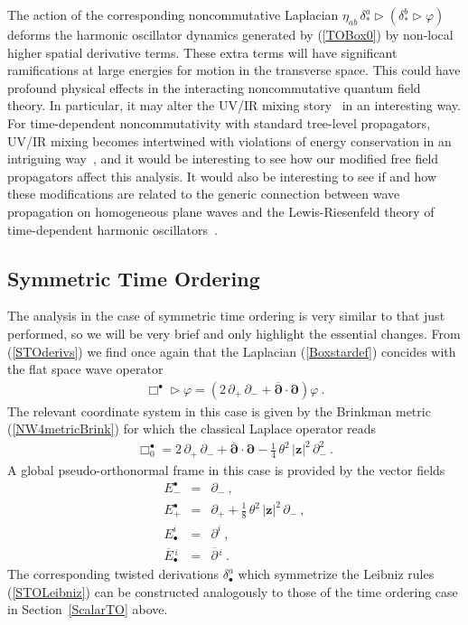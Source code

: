 \documentclass[11pt,a4paper]{article}
\def\nn{\nonumber}
\newcommand{\1}{\mathbb{1}}
\newcommand{\mbf}[1]{{\boldsymbol {#1} }}
\def\mz{{\mbf z}}
\def\mdell{{\mbf\partial}}
\def\nn{\nonumber}
\def\bea{\begin{eqnarray}}
\def\eea{\end{eqnarray}}
\newcommand{\beq}{\begin{eqnarray}}
\newcommand{\eeq}{\end{eqnarray}}
\begin{document}
The action of the corresponding noncommutative Laplacian
$\eta_{ab}\,\delta_*^a\triangleright(\delta_*^b\triangleright\varphi)$
deforms the harmonic oscillator dynamics generated by (\ref{TOBox0})
by non-local higher spatial derivative terms. These extra terms will
have significant ramifications at large energies for motion in the
transverse space. This could have profound physical effects in the
interacting noncommutative quantum field theory. In particular, it may
alter the UV/IR mixing story~\cite{MVRS1} in an interesting way. For
time-dependent noncommutativity with standard tree-level propagators,
UV/IR mixing becomes intertwined with violations of energy
conservation in an intriguing way~\cite{BG1,RS1}, and it would be
interesting to see how our modified free field propagators affect this
analysis. It would also be interesting to see if and how these
modifications are related to the generic connection between wave
propagation on homogeneous plane waves and the Lewis-Riesenfeld theory
of time-dependent harmonic oscillators~\cite{BlauOL1}.

\subsection{Symmetric Time Ordering\label{ScalarSTO}}

The analysis in the case of symmetric time ordering is very similar to
that just performed, so we will be very brief and only highlight the
essential changes. From (\ref{STOderivs}) we find once again that the
Laplacian (\ref{Boxstardef}) concides with the flat space wave
operator
\beq
\Box^\bullet\triangleright\varphi=\left(2\,\partial_+\,\partial_-+
\overline{\mdell}\cdot\mdell\right)\varphi \ .
\label{STOBoxeq}\eeq
The relevant coordinate system in this case is given by the Brinkman
metric (\ref{NW4metricBrink}) for which the classical Laplace
operator reads
\beq
\Box_0^\bullet=2\,\partial_+\,\partial_-+\overline{\mdell}\cdot
\mdell-\mbox{$\frac14$}\,\theta^2\,|\mz|^2\,\partial_-^2 \ .
\label{STOBox0}\eeq
A global pseudo-orthonormal frame in this case is provided by the
vector fields
\bea
E_-^\bullet&=&\partial_- \ , \nn\\ E_+^\bullet&=&\partial_++
\mbox{$\frac18$}\,\theta^2\,|\mz|^2\,\partial_- \ ,
\nn\\ E^{i}_\bullet&=&\partial^i \ , \nn\\
\overline{E}{}_{\bullet}^{\,i}&=&\overline{\partial}{}^{\,i} \ .
\label{STOorthoframe}\eea
The corresponding twisted derivations $\delta^a_\bullet$ which
symmetrize the Leibniz rules (\ref{STOLeibniz}) can be constructed
analogously to those of the time ordering case in
Section~\ref{ScalarTO} above.
\end{document}
